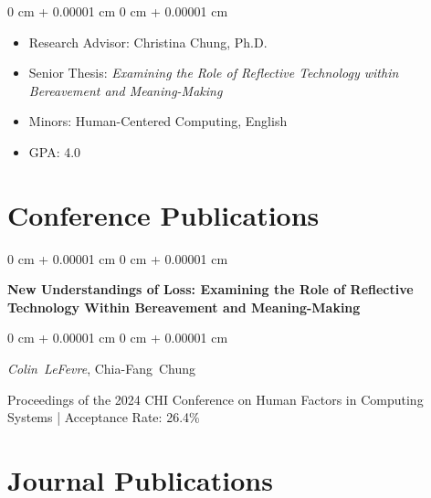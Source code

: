 \documentclass[10pt, letterpaper]{article}
\newenvironment{highlights}{
    \begin{itemize}[
        topsep=0.10 cm,
        parsep=0.10 cm,
        partopsep=0pt,
        itemsep=0pt,
        leftmargin=0 cm + 10pt
    ]
}{
    \end{itemize}
} %
\newenvironment{onecolentry}{
    \begin{adjustwidth}{
        0 cm + 0.00001 cm
    }{
        0 cm + 0.00001 cm
    }
}{
    \end{adjustwidth}
} %
\newenvironment{twocolentry}[2][]{
    \onecolentry
    \def\secondColumn{#2}
    \setcolumnwidth{\fill, 4.0 cm}
    \begin{paracol}{2}
}{
    \switchcolumn \raggedleft \secondColumn
    \end{paracol}
    \endonecolentry
} %
\begin{document}
        \vspace{0.10 cm}
        \begin{onecolentry}
            \begin{highlights}
                \item Research Advisor: Christina Chung, Ph.D.
                \item Senior Thesis: \textit{Examining the Role of Reflective Technology within Bereavement and Meaning-Making}
                \item Minors: Human-Centered Computing, English
                \item GPA: 4.0
            \end{highlights}
        \end{onecolentry}



    
    \section{Conference Publications}



        
        \begin{samepage}
            \begin{twocolentry}{
                2024
            }
                \textbf{New Understandings of Loss: Examining the Role of Reflective Technology Within Bereavement and Meaning-Making}
            \end{twocolentry}

            \vspace{0.10 cm}
            
            \begin{onecolentry}
                \mbox{\textit{Colin LeFevre}}, \mbox{Chia-Fang Chung}

                \vspace{0.10 cm}
                
        Proceedings of the 2024 CHI Conference on Human Factors in Computing Systems | Acceptance Rate: 26.4\%\end{onecolentry}
        \end{samepage}


    
    \section{Journal Publications}
\end{document}
